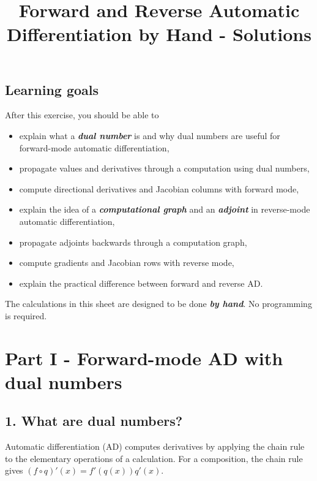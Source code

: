 \documentclass[10pt]{article}
\begin{document}
\title{Forward and Reverse Automatic Differentiation by Hand - Solutions}
\author{}
\date{}
\maketitle
\subsection*{Learning goals}
After this exercise, you should be able to

\begin{itemize}
\item
explain what a \textbf{\textit{dual number}} is and why dual numbers are useful for forward-mode automatic differentiation,

\item
propagate values and derivatives through a computation using dual numbers,

\item
compute directional derivatives and Jacobian columns with forward mode,

\item
explain the idea of a \textbf{\textit{computational graph}} and an \textbf{\textit{adjoint}} in reverse-mode automatic differentiation,

\item
propagate adjoints backwards through a computation graph,

\item
compute gradients and Jacobian rows with reverse mode,

\item
explain the practical difference between forward and reverse AD.

\end{itemize}
The calculations in this sheet are designed to be done \textbf{\textit{by hand}}. No programming is required.

\clearpage
\section*{Part I - Forward-mode AD with dual numbers}
\subsection*{1. What are dual numbers?}
Automatic differentiation (AD) computes derivatives by applying the chain rule to the elementary operations of a calculation. For a composition, the chain rule gives $(f\circ q)'(x)=f'(q(x))q'(x)$.
\end{document}
